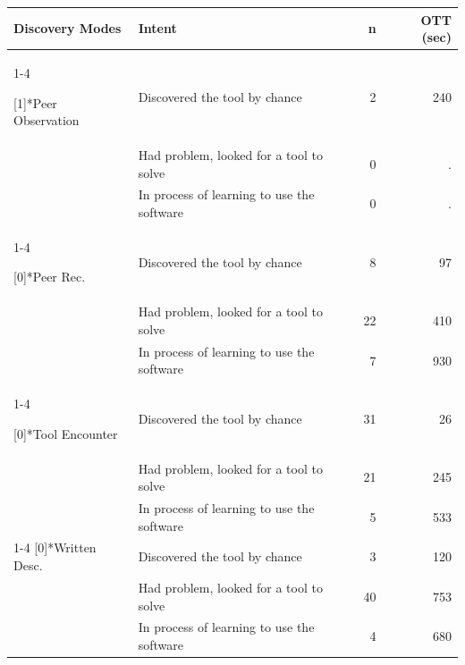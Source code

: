 \documentclass[smallextended]{svjour3}
\begin{document}
\begin{table}[t]

\renewcommand{\arraystretch}{1.4} 

   \centering

	\label{tbl:context}
	
   \begin{tabularx}{\linewidth}{p{25mm}Xrr}
   		\textbf{Discovery Modes}&\textbf{Intent}&\textbf{n}&\textbf{OTT (sec)} \\
		
		\cline{1-4}
		
		
    \multirow{3}[1]{*}{Peer Observation} & Discovered the tool by chance & 2     & 240   \\
          & Had problem, looked for a tool to solve & 0     & .    \\
          & In process of learning to use the software & 0     & .  \\
		
		\cline{1-4}
		
    \multirow{3}[0]{*}{Peer Rec.} & Discovered the tool by chance & 8     & 97    \\
          & Had problem, looked for a tool to solve & 22    & 410    \\
          & In process of learning to use the software & 7     & 930 \\
    
    \cline{1-4}
    		
    \multirow{3}[0]{*}{Tool Encounter} & Discovered the tool by chance & 31    & 26 \\
          & Had problem, looked for a tool to solve & 21    & 245    \\
          & In process of learning to use the software & 5     & 533   \\

   \cline{1-4}
    \multirow{3}[0]{*}{Written Desc.} & Discovered the tool by chance & 3     & 120   \\
          & Had problem, looked for a tool to solve & 40    & 753   \\
          & In process of learning to use the software & 4     & 680  \\


\end{tabularx}
\end{table}
\end{document}
